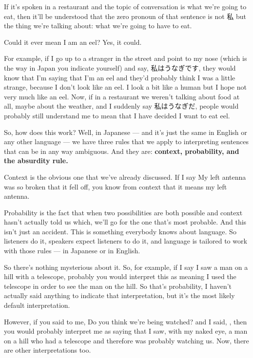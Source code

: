If it's spoken in a restaurant and the topic of conversation is what we're going to eat, then it'll be understood that the zero pronoun of that sentence is not 私 but the thing we're talking about: what we're going to have to eat.

\thinrule

Could it ever mean I am an eel? Yes, it could.

For example, if I go up to a stranger in the street and point to my nose (which is the way in Japan you indicate yourself) and say, 私はうなぎです, they would know that I'm saying that I'm an eel and they'd probably think I was a little strange, because I don't look like an eel. I look a bit like a human but I hope not very much like an eel. Now, if in a restaurant we weren't talking about food at all, maybe about the weather, and I suddenly say 私はうなぎだ, people would probably still understand me to mean that I have decided I want to eat eel.

So, how does this work? Well, in Japanese --- and it's just the same in English or any other language --- we have three rules that we apply to interpreting sentences that can be in any way ambiguous. And they are: {\bf context, probability, and the absurdity rule.}

{}

Context is the obvious one that we've already discussed. If I say My left antenna was so broken that it fell off, you know from context that it means my left antenna.

\stopsectionlevel

\startsectionlevel[title={The Probability Rule},reference={the-probability-rule}]

Probability is the fact that when two possibilities are both possible and context hasn't actually told us which, we'll go for the one that's most probable. And this isn't just an accident. This is something everybody knows about language. So listeners do it, speakers expect listeners to do it, and language is tailored to work with those rules --- in Japanese or in English.

So there's nothing mysterious about it. So, for example, if I say I saw a man on a hill with a telescope, probably you would interpret this as meaning I used the telescope in order to see the man on the hill. So that's probability, I haven't actually said anything to indicate that interpretation, but it's the most likely default interpretation.

However, if you said to me, Do you think we're being watched? and I said, , then you would probably interpret me as saying that I saw, with my naked eye, a man on a hill who had a telescope and therefore was probably watching us. Now, there are other interpretations too.

